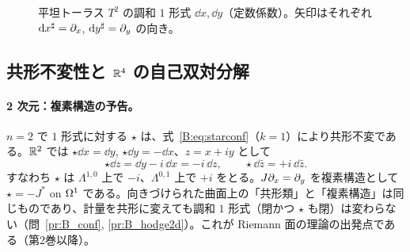 \begin{figure}[ht]
\centering
{}
\caption{平坦トーラス $T^2$ の調和 $1$ 形式 $\dd x,\dd y$（定数係数）。矢印はそれぞれ $\mathrm{d} x^\sharp=\partial_x$, $\mathrm{d} y^\sharp=\partial_y$ の向き。}\label{B:fig:T2harm}
\end{figure}

\subsection{共形不変性と $\mathbb R^4$ の自己双対分解}\label{B:ss:conf}

\paragraph{2 次元：複素構造の予告。}$n=2$ で $1$ 形式に対する $\star$ は、式~\eqref{B:eq:starconf}（$k=1$）により共形不変である。$\mathbb R^2$ では $\star\dd x=\dd y$, $\star\dd y=-\dd x$、$z=x+iy$ として
\[
\star\dd z=\dd y-i\,\dd x=-i\,\dd z,\qquad\star\dd\bar z=+i\,\dd\bar z .
\]
すなわち $\star$ は $\Lambda^{1,0}$ 上で $-i$、$\Lambda^{0,1}$ 上で $+i$ をとる。$J\partial_x=\partial_y$ を複素構造として $\star=-J^*$ on $\Omega^1$ である。向きづけられた曲面上の「共形類」と「複素構造」は同じものであり、計量を共形に変えても調和 $1$ 形式（閉かつ $\star$ も閉）は変わらない（問~\ref{pr:B_conf}, \ref{pr:B_hodge2d}）。これが Riemann 面の理論の出発点である（第2巻以降）。

